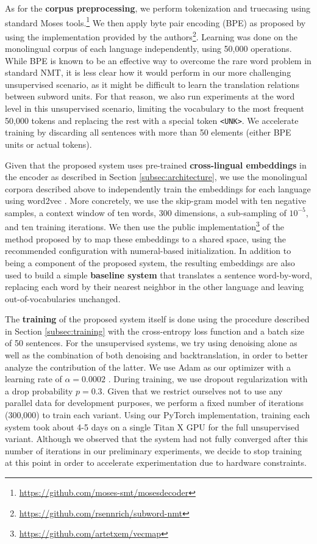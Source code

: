 \documentclass{article} \usepackage{iclr2018_conference,times}
\begin{document}
As for the \textbf{corpus preprocessing}, we perform tokenization and truecasing using standard Moses tools.\footnote{\url{https://github.com/moses-smt/mosesdecoder}} We then apply byte pair encoding (BPE) as proposed by \citet{sennrich2016neural} using the implementation provided by the authors\footnote{\url{https://github.com/rsennrich/subword-nmt}}. Learning was done on the monolingual corpus of each language independently, using 50,000 operations. While BPE is known to be an effective way to overcome the rare word problem in standard NMT, it is less clear how it would perform in our more challenging unsupervised scenario, as it might be difficult to learn the translation relations between subword units. For that reason, we also run experiments at the word level in this unsupervised scenario, limiting the vocabulary to the most frequent 50,000 tokens and replacing the rest with a special token \texttt{<UNK>}. We accelerate training by discarding all sentences with more than 50 elements (either BPE units or actual tokens).

Given that the proposed system uses pre-trained \textbf{cross-lingual embeddings} in the encoder as described in Section \ref{subsec:architecture}, we use the monolingual corpora described above to independently train the embeddings for each language using word2vec \citep{mikolov2013distributed}. More concretely, we use the skip-gram model with ten negative samples, a context window of ten words, 300 dimensions, a sub-sampling of $10^{-5}$, and ten training iterations. We then use the public implementation\footnote{\url{https://github.com/artetxem/vecmap}} of the method proposed by \citet{artetxe2017learning} to map these embeddings to a shared space, using the recommended configuration with numeral-based initialization. In addition to being a component of the proposed system, the resulting embeddings are also used to build a simple \textbf{baseline system} that translates a sentence word-by-word, replacing each word by their nearest neighbor in the other language and leaving out-of-vocabularies unchanged.

The \textbf{training} of the proposed system itself is done using the procedure described in Section \ref{subsec:training} with the cross-entropy loss function and a batch size of 50 sentences. For the unsupervised systems, we try using denoising alone as well as the combination of both denoising and backtranslation, in order to better analyze the contribution of the latter. We use Adam as our optimizer with a learning rate of $\alpha=0.0002$ \citep{diederik2015adam}. During training, we use dropout regularization with a drop probability $p=0.3$. Given that we restrict ourselves not to use any parallel data for development purposes, we perform a fixed number of iterations (300,000) to train each variant. Using our PyTorch implementation, training each system took about 4-5 days on a single Titan X GPU for the full unsupervised variant. Although we observed that the system had not fully converged after this number of iterations in our preliminary experiments, we decide to stop training at this point in order to accelerate experimentation due to hardware constraints.
\end{document}
